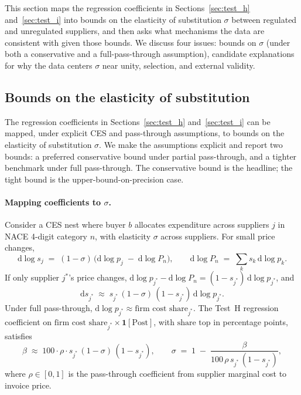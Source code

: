 This section maps the regression coefficients in Sections~\ref{sec:test_h} and~\ref{sec:test_i} into bounds on the elasticity of substitution $\sigma$ between regulated and unregulated suppliers, and then asks what mechanisms the data are consistent with given those bounds. We discuss four issues: bounds on $\sigma$ (under both a conservative and a full-pass-through assumption), candidate explanations for why the data centers $\sigma$ near unity, selection, and external validity.

\subsection{Bounds on the elasticity of substitution}\label{sec:bounds}

The regression coefficients in Sections~\ref{sec:test_h} and~\ref{sec:test_i} can be mapped, under explicit CES and pass-through assumptions, to bounds on the elasticity of substitution $\sigma$. We make the assumptions explicit and report two bounds: a preferred conservative bound under partial pass-through, and a tighter benchmark under full pass-through. The conservative bound is the headline; the tight bound is the upper-bound-on-precision case.

\paragraph{Mapping coefficients to $\sigma$.} Consider a CES nest where buyer $b$ allocates expenditure across suppliers $j$ in NACE 4-digit category $n$, with elasticity $\sigma$ across suppliers. For small price changes,
\[
    \mathrm{d}\log s_{j} \;=\; (1 - \sigma)\,\bigl(\mathrm{d}\log p_{j} \;-\; \mathrm{d}\log P_n\bigr),
    \qquad
    \mathrm{d}\log P_n \;=\; \sum_{k} s_k\,\mathrm{d}\log p_k.
\]
If only supplier $j^*$'s price changes, $\mathrm{d}\log p_{j^*} - \mathrm{d}\log P_n = (1 - s_{j^*})\,\mathrm{d}\log p_{j^*}$, and
\[
    \mathrm{d} s_{j^*} \;\approx\; s_{j^*}\,(1 - \sigma)\,(1 - s_{j^*})\,\mathrm{d}\log p_{j^*}.
\]
Under full pass-through, $\mathrm{d}\log p_{j^*} \approx \text{firm cost share}_{j^*}$. The Test~H regression coefficient on $\text{firm cost share}_{j^*} \times \mathbf{1}[\text{Post}]$, with $\text{share top}$ in percentage points, satisfies
\begin{equation}
    \beta \;\approx\; 100 \cdot \rho \cdot s_{j^*}\,(1 - \sigma)\,(1 - s_{j^*}),
    \qquad
    \sigma \;=\; 1 \;-\; \frac{\beta}{100\,\rho\,s_{j^*}\,(1 - s_{j^*})},
    \label{eq:sigma_within}
\end{equation}
where $\rho \in [0, 1]$ is the pass-through coefficient from supplier marginal cost to invoice price.

